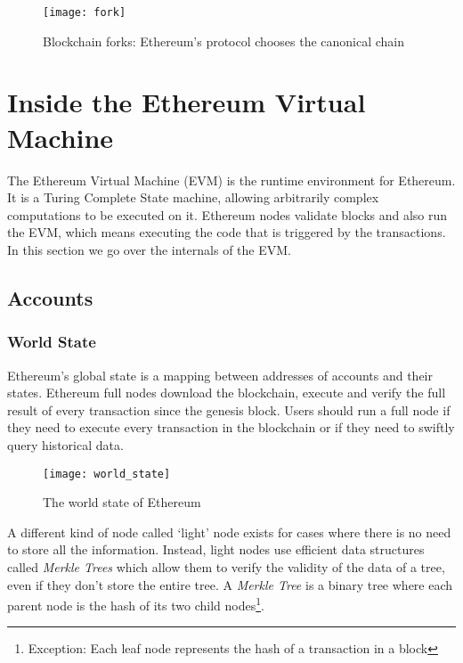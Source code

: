 \begin{figure}[H]
    \centering
    \texttt{[image: fork]}
    \caption{Blockchain forks: Ethereum's protocol chooses the canonical chain \cite{preethi}}
    \label{fig:forking}
\end{figure}

\section{Inside the Ethereum Virtual Machine}
The Ethereum Virtual Machine (EVM) is the runtime environment for Ethereum. It is a Turing Complete State machine, allowing arbitrarily complex computations to be executed on it. Ethereum nodes validate blocks and also run the EVM, which means executing the code that is triggered by the transactions. In this section we go over the internals of the EVM. 

\subsection{Accounts}

\subsubsection{World State}
Ethereum's global state is a mapping between addresses of accounts and their states. Ethereum full nodes download the blockchain, execute and verify the full result of every transaction since the genesis block. Users should run a full node if they need to execute every transaction in the blockchain or if they need to swiftly query historical data. 

\begin{figure}[H]
    \centering
    \texttt{[image: world\_state]}
    \caption{The world state of Ethereum}
    \label{fig:worldstate}
\end{figure}

A different kind of node called `light' node exists for cases where there is no need to store all the information. Instead, light nodes use efficient data structures called \textit{Merkle Trees} which allow them to verify the validity of the data of a tree, even if they don't store the entire tree. A \textit{Merkle Tree} is a binary tree where each parent node is the hash of its two child nodes\footnote{Exception: Each leaf node represents the hash of a transaction in a block}. 

